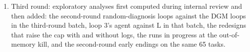 \begin{enumerate}
agent is \wsMovesInitAbs{} points below the textbook agent ($p=\wsMovesInitP$). In an exploratory comparison of the same
tasks between the second-round batch and this one, the rate of the best agent changes by $\wxBest$ points [$\wxBestlo$,
$\wxBesthi$] and that of the initial agent by $\wxInit$ [$\wxInitlo$, $\wxInithi$], while the textbook agent reproduces
its earlier rate within $\wxMovesAbs$ points; the two batches differ in the output limit, the parallelism and the machine
load.
\item Third round: exploratory analyses first computed during internal review and then added: the second-round
random-diagnosis loops against the DGM loops in the third-round batch, loop 3's agent against L in that batch, the redesigns
that raise the cap with and without logs, the runs in progress at the out-of-memory kill, and the second-round early
endings on the same 65 tasks.
\end{enumerate}


